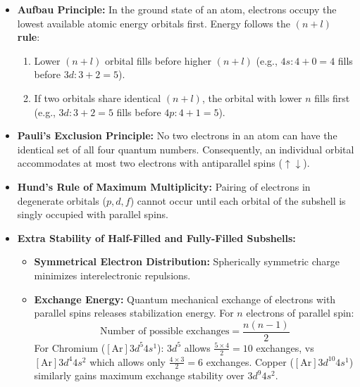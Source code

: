 \documentclass[10pt,twoside,openright]{book}
\begin{document}
\begin{conceptbox}
\begin{itemize}
  \item \textbf{Aufbau Principle:} In the ground state of an atom, electrons occupy the lowest available atomic energy orbitals first. Energy follows the \textbf{$(n+l)$ rule}:
  \begin{enumerate}
    \item Lower $(n+l)$ orbital fills before higher $(n+l)$ (e.g., $4s: 4+0=4$ fills before $3d: 3+2=5$).
    \item If two orbitals share identical $(n+l)$, the orbital with lower $n$ fills first (e.g., $3d: 3+2=5$ fills before $4p: 4+1=5$).
  \end{enumerate}
  \item \textbf{Pauli's Exclusion Principle:} No two electrons in an atom can have the identical set of all four quantum numbers. Consequently, an individual orbital accommodates at most two electrons with antiparallel spins ($\uparrow\downarrow$).
  \item \textbf{Hund's Rule of Maximum Multiplicity:} Pairing of electrons in degenerate orbitals ($p, d, f$) cannot occur until each orbital of the subshell is singly occupied with parallel spins.
  \item \textbf{Extra Stability of Half-Filled and Fully-Filled Subshells:}
  \begin{itemize}
    \item \textbf{Symmetrical Electron Distribution:} Spherically symmetric charge minimizes interelectronic repulsions.
    \item \textbf{Exchange Energy:} Quantum mechanical exchange of electrons with parallel spins releases stabilization energy. For $n$ electrons of parallel spin:
    \begin{equation}
      \text{Number of possible exchanges} = \frac{n(n-1)}{2}
    \end{equation}
    For Chromium ($[\mathrm{Ar}] 3d^5 4s^1$): $3d^5$ allows $\frac{5\times 4}{2} = 10$ exchanges, vs $[\mathrm{Ar}] 3d^4 4s^2$ which allows only $\frac{4\times 3}{2} = 6$ exchanges. Copper ($[\mathrm{Ar}] 3d^{10} 4s^1$) similarly gains maximum exchange stability over $3d^9 4s^2$.
  \end{itemize}
\end{itemize}
\end{conceptbox}

\end{document}
